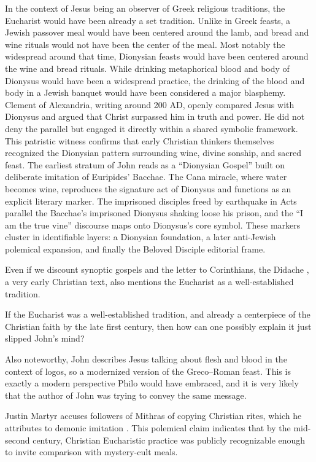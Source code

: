 In the context of Jesus being an observer of Greek religious traditions, the Eucharist would have been already a set tradition.
Unlike in Greek feasts, a Jewish passover meal would have been centered around the lamb, and bread and wine rituals would not have been the center of the meal.
Most notably the widespread around that time, Dionysian feasts would have been centered around the wine and bread rituals.
While drinking metaphorical blood and body of Dionysus would have been a widespread practice, the drinking of the blood and body in a Jewish banquet would have been considered a major blasphemy.
Clement of Alexandria, writing around 200 AD, openly compared Jesus with Dionysus and argued that Christ surpassed him in truth and power.
He did not deny the parallel but engaged it directly within a shared symbolic framework.
This patristic witness confirms that early Christian thinkers themselves recognized the Dionysian pattern surrounding wine, divine sonship, and sacred feast.
The earliest stratum of John reads as a ``Dionysian Gospel'' built on deliberate imitation of Euripides' Bacchae.
The Cana miracle, where water becomes wine, reproduces the signature act of Dionysus and functions as an explicit literary marker.
The imprisoned disciples freed by earthquake in Acts parallel the Bacchae's imprisoned Dionysus shaking loose his prison, and the ``I am the true vine'' discourse maps onto Dionysus's core symbol.
These markers cluster in identifiable layers: a Dionysian foundation, a later anti-Jewish polemical expansion, and finally the Beloved Disciple editorial frame.

Even if we discount synoptic gospels and the letter to Corinthians, the Didache \cite{didache}, a very early Christian text, also mentions the Eucharist as a well-established tradition.

If the Eucharist was a well-established tradition, and already a centerpiece of the Christian faith by the late first century, then how can one possibly explain it just slipped John's mind?

Also noteworthy, John describes Jesus talking about flesh and blood in the context of logos, so a modernized version of the Greco--Roman feast.
This is exactly a modern perspective Philo would have embraced, and it is very likely that the author of John was trying to convey the same message.

Justin Martyr accuses followers of Mithras of copying Christian rites, which he attributes to demonic imitation \cite[66]{justinmartyr:apology}.
This polemical claim indicates that by the mid-second century, Christian Eucharistic practice was publicly recognizable enough to invite comparison with mystery-cult meals.

